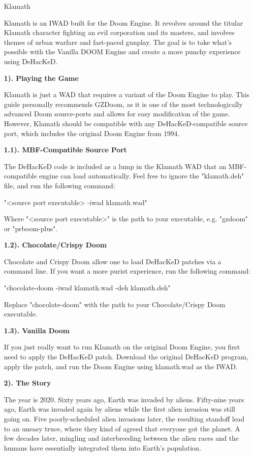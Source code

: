 \documentclass[12pt]{article}
\begin{document}
\begin{flushleft}
\begin{center}
Klamath
\end{center}

Klamath is an IWAD built for the Doom Engine. It revolves around the titular Klamath character fighting an evil corporation and its masters, and involves themes of urban warfare and fast-paced gunplay.  The goal is to take what's possible with the Vanilla DOOM Engine and create a more punchy experience using DeHacKeD.

\textbf{1). Playing the Game}

Klamath is just a WAD that requires a variant of the Doom Engine to play. This guide personally recommends GZDoom, as it is one of the most technologically advanced Doom source-ports and allows for easy modification of the game. However, Klamath should be compatible with any DeHacKeD-compatible source port, which includes the original Doom Engine from 1994.

\textbf{1.1). MBF-Compatible Source Port}

The DeHacKeD code is included as a lump in the Klamath WAD that an MBF-compatible engine can load automatically. Feel free to ignore the "klamath.deh" file, and run the following command:

"<source port executable> -iwad klamath.wad"

Where "<source port executable>" is the path to your executable, e.g. "gzdoom" or "prboom-plus".

\textbf{1.2). Chocolate/Crispy Doom}

Chocolate and Crispy Doom allow one to load DeHacKeD patches via a command line. If you want a more purist experience, run the following command:

"chocolate-doom -iwad klamath.wad -deh klamath.deh"

Replace "chocolate-doom" with the path to your Chocolate/Crispy Doom executable.

\textbf{1.3). Vanilla Doom}

If you just really want to run Klamath on the original Doom Engine, you first need to apply the DeHacKeD patch. Download the original DeHacKeD program, apply the patch, and run the Doom Engine using klamath.wad as the IWAD.

\textbf{2). The Story}

The year is 2020. Sixty years ago, Earth was invaded by aliens. Fifty-nine years ago, Earth was invaded again by aliens while the first alien invasion was still going on. Five poorly-scheduled alien invasions later, the resulting standoff lead to an uneasy truce, where they kind of agreed that everyone got the planet. A few decades later, mingling and interbreeding between the alien races and the humans have essentially integrated them into Earth's population.


\end{flushleft}
\end{document}
